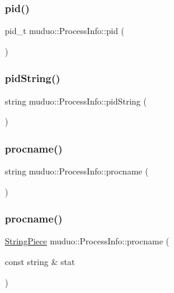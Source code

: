 \subsubsection{\texorpdfstring{pid()}{pid()}}
{\footnotesize\ttfamily pid\+\_\+t muduo\+::\+Process\+Info\+::pid (\begin{DoxyParamCaption}{ }\end{DoxyParamCaption})}

\mbox{\label{namespacemuduo_1_1ProcessInfo_af54b6cc2e94622bf45a9ced0093b7dae}} 
\subsubsection{\texorpdfstring{pid\+String()}{pidString()}}
{\footnotesize\ttfamily string muduo\+::\+Process\+Info\+::pid\+String (\begin{DoxyParamCaption}{ }\end{DoxyParamCaption})}

\mbox{\label{namespacemuduo_1_1ProcessInfo_ac8a6ab8cb6657fc7ddba4a8be2f60e2b}} 
\subsubsection{\texorpdfstring{procname()}{procname()}\hspace{0.1cm}{\footnotesize\ttfamily [1/2]}}
{\footnotesize\ttfamily string muduo\+::\+Process\+Info\+::procname (\begin{DoxyParamCaption}{ }\end{DoxyParamCaption})}

\mbox{\label{namespacemuduo_1_1ProcessInfo_acb222d923a768bc8e9ecceaf21ac4ba3}} 
\subsubsection{\texorpdfstring{procname()}{procname()}\hspace{0.1cm}{\footnotesize\ttfamily [2/2]}}
{\footnotesize\ttfamily \hyperlink{classmuduo_1_1StringPiece}{String\+Piece} muduo\+::\+Process\+Info\+::procname (\begin{DoxyParamCaption}\item[{const string \&}]{stat }\end{DoxyParamCaption})}

